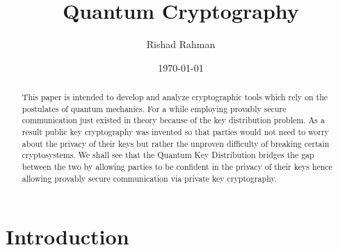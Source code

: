 \documentclass[aps,prd,final,twocolumn,letterpaper]{revtex4}
\begin{document}

\title{Quantum Cryptography}
\author{Rishad Rahman}
\date{\today} 

\begin{abstract}
\noindent	
This paper is intended to develop and analyze cryptographic tools which rely on the postulates of quantum mechanics. For a while employing provably secure communication just existed in theory because of the key distribution problem. As a result public key cryptography was invented so that parties would not need to worry about the privacy of their keys but rather the unproven difficulty of breaking certain cryptosystems. We shall see that the Quantum Key Distribution bridges the gap between the two by allowing parties to be confident in the privacy of their keys hence allowing provably secure communication via private key cryptography.  
\end{abstract}

\maketitle

\pagestyle{myheadings}
\thispagestyle{empty}


\section{Introduction}
\end{document}
